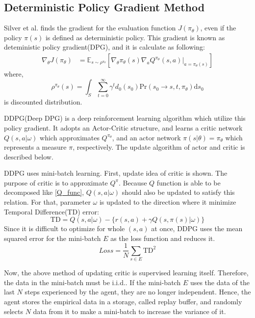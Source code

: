 \documentclass[english, dvipdfmx]{ampmt}             %
\newcommand{\expect}{\mathbb{E}}
\begin{document}
\subsection{Deterministic Policy Gradient Method}
Silver et al.\cite{DPG} finds the gradient for the evaluation function $J(\pi_{\theta})$, even if the policy $\pi(s)$ is defined as deterministic policy. This gradient is known as deteministic policy gradient(DPG), and it is calculate as following:
\begin{align}
	\nabla_{\theta}J(\pi_{\theta}) &= \expect_{s\sim\rho^{\pi_{\theta}}}[
	\nabla_{\theta}\pi_{\theta}(s)\nabla_{a}Q^{\pi_{\theta}}(s, a)|_{a=\pi_{\theta}(s)}] \label{true_pg} 
\end{align}
where, 
\begin{equation}
	\rho^{\pi_{\theta}}(s) = \int_{S}\sum_{t=0}^{\infty}\gamma^td_0(s_0)\textrm{Pr}(s_0\to s, t,  \pi_{\theta})\textrm{d}s_0
\end{equation}
is discounted distribution.\par
DDPG(Deep DPG) is a deep reinforcement learning algorithm which utilize this policy gradient. It adopts an Actor-Critic structure, and learns a critic network $Q(s,a|\omega)$ which approximates $Q^{\pi_{\theta}}$, and an actor network $\pi(s|\theta)=\pi_{\theta}$ which represents a measure $\pi$, respectively. The update algorithm of actor and critic is described below.\par
DDPG uses mini-batch learning. First, update idea of critic is shown. The purpose of critic is to approximate $Q^{\pi}$. Because $Q$ function is able to be decomposed like \eqref{Q_func}, $Q(s,a|\omega)$ should also be updated to satisfy this relation. For that, parameter $\omega$ is updated to the direction where it minimize Temporal Difference(TD) error: 
\begin{equation}
	\textrm{TD} = Q(s,a|\omega) - \{r(s,a)+\gamma Q(s,\pi(s)|\omega)\}
\end{equation}
Since it is difficult to optimize for whole $(s,a)$ at once, DDPG uses the mean squared error for the mini-batch $E$ as the loss function and reduces it. 
\begin{equation}
	Loss = \frac{1}{N}\sum_{s\in E} \textrm{TD}^2
\end{equation}\par
Now, the above method of updating critic is supervised learning itself. Therefore, the data in the mini-batch must be i.i.d.. If the mini-batch $E$ uses the data of the last $N$ steps experienced by the agent, they are no longer independent. Hence, the agent stores the empirical data in a storage, called replay buffer, and randomly selects $N$ data from it to make a mini-batch to increase the variance of it.\par
\end{document}
